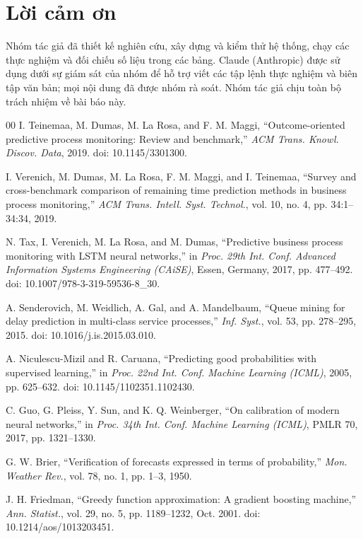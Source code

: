 \documentclass[journal]{IEEEtran}
\begin{document}
\section*{Lời cảm ơn}
Nhóm tác giả đã thiết kế nghiên cứu, xây dựng và kiểm thử hệ thống, chạy các thực nghiệm và đối chiếu số liệu trong các bảng. Claude (Anthropic) được sử dụng dưới sự giám sát của nhóm để hỗ trợ viết các tập lệnh thực nghiệm và biên tập văn bản; mọi nội dung đã được nhóm rà soát. Nhóm tác giả chịu toàn bộ trách nhiệm về bài báo này.

\begin{thebibliography}{00}
 I. Teinemaa, M. Dumas, M. La Rosa, and F. M. Maggi, ``Outcome-oriented predictive process monitoring: Review and benchmark,'' \textit{ACM Trans. Knowl. Discov. Data}, 2019. doi: 10.1145/3301300.

 I. Verenich, M. Dumas, M. La Rosa, F. M. Maggi, and I. Teinemaa, ``Survey and cross-benchmark comparison of remaining time prediction methods in business process monitoring,'' \textit{ACM Trans. Intell. Syst. Technol.}, vol. 10, no. 4, pp. 34:1--34:34, 2019.

 N. Tax, I. Verenich, M. La Rosa, and M. Dumas, ``Predictive business process monitoring with LSTM neural networks,'' in \textit{Proc. 29th Int. Conf. Advanced Information Systems Engineering (CAiSE)}, Essen, Germany, 2017, pp. 477--492. doi: 10.1007/978-3-319-59536-8\_30.

 A. Senderovich, M. Weidlich, A. Gal, and A. Mandelbaum, ``Queue mining for delay prediction in multi-class service processes,'' \textit{Inf. Syst.}, vol. 53, pp. 278--295, 2015. doi: 10.1016/j.is.2015.03.010.

 A. Niculescu-Mizil and R. Caruana, ``Predicting good probabilities with supervised learning,'' in \textit{Proc. 22nd Int. Conf. Machine Learning (ICML)}, 2005, pp. 625--632. doi: 10.1145/1102351.1102430.

 C. Guo, G. Pleiss, Y. Sun, and K. Q. Weinberger, ``On calibration of modern neural networks,'' in \textit{Proc. 34th Int. Conf. Machine Learning (ICML)}, PMLR 70, 2017, pp. 1321--1330.

 G. W. Brier, ``Verification of forecasts expressed in terms of probability,'' \textit{Mon. Weather Rev.}, vol. 78, no. 1, pp. 1--3, 1950.

 J. H. Friedman, ``Greedy function approximation: A gradient boosting machine,'' \textit{Ann. Statist.}, vol. 29, no. 5, pp. 1189--1232, Oct. 2001. doi: 10.1214/aos/1013203451.


\end{thebibliography}
\end{document}
